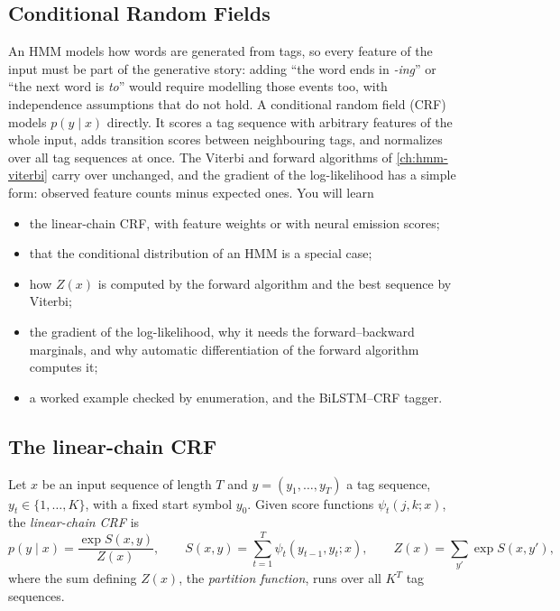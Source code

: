 \begin{notechapter}
\chapter{Conditional Random Fields}\label{ch:crf}

\begin{chapterintro}
An HMM models how words are generated from tags, so every feature of the input must be
part of the generative story: adding ``the word ends in \emph{-ing}'' or ``the next word is \emph{to}'' would
require modelling those events too, with independence assumptions that do not hold. A
conditional random field (CRF) models $p(y\mid x)$ directly. It scores a tag sequence with arbitrary
features of the whole input, adds transition scores between neighbouring tags, and
normalizes over all tag sequences at once. The Viterbi and forward algorithms of
\cref{ch:hmm-viterbi} carry over unchanged, and the gradient of the log-likelihood has a
simple form: observed feature counts minus expected ones. You will learn
\begin{itemize}[nosep]
  \item the linear-chain CRF, with feature weights or with neural emission scores;
  \item that the conditional distribution of an HMM is a special case;
  \item how $Z(x)$ is computed by the forward algorithm and the best sequence by Viterbi;
  \item the gradient of the log-likelihood, why it needs the forward--backward marginals, and
        why automatic differentiation of the forward algorithm computes it;
  \item a worked example checked by enumeration, and the BiLSTM--CRF tagger.
\end{itemize}
\end{chapterintro}

\section{The linear-chain CRF}\label{crf:sec:definition}

\begin{definition}\label{crf:def:crf}
Let $x$ be an input sequence of length $T$ and $y = (y_1,\dots,y_T)$ a tag sequence, $y_t\in\{1,\dots,K\}$, with a fixed start
symbol $y_0$. Given score functions $\psi_t(j, k; x)$, the \emph{linear-chain CRF} is
\[
  p(y\mid x) = \frac{\exp S(x, y)}{Z(x)},\qquad S(x, y) = \sum_{t=1}^T\psi_t(y_{t-1}, y_t; x),\qquad Z(x) = \sum_{y'}\exp S(x, y'),
\]
where the sum defining $Z(x)$, the \emph{partition function}, runs over all $K^T$ tag sequences.
\end{definition}


\end{notechapter}
